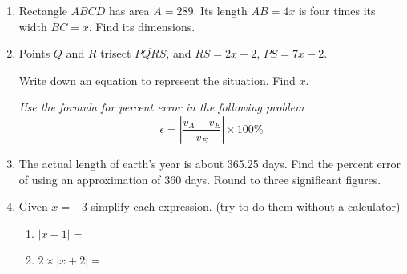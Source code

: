 \begin{enumerate}
\newpage
\item Rectangle $ABCD$ has area $A=289$. Its length $AB=4x$ is four times its width $BC=x$. Find its dimensions.
  \begin{flushright}
  \end{flushright} \vspace{2cm}

\item Points $Q$ and $R$ trisect $\overline{PQRS}$, and $RS=2x+2$, $PS=7x-2$. \par \smallskip
Write down an equation to represent the situation. Find $x$.
  \begin{flushleft}
  \end{flushleft} \vspace{5cm}


\emph{Use the formula for percent error in the following problem}
$$\epsilon = \left|\frac{v_A-v_E}{v_E}\right| \times 100\%$$

\item The actual length of earth's year is about 365.25 days. Find the percent error of using an approximation of 360 days. Round to three significant figures.
  
\newpage
\item Given $x=-3$ simplify each expression. (try to do them without a calculator)
  \begin{multicols}{2}
    \begin{enumerate}[itemsep=1.25cm]
      \item $|x-1|=$
      \item $2 \times|x+2|=$
    \end{enumerate}
  \end{multicols} \vspace{1cm}


\end{enumerate}
